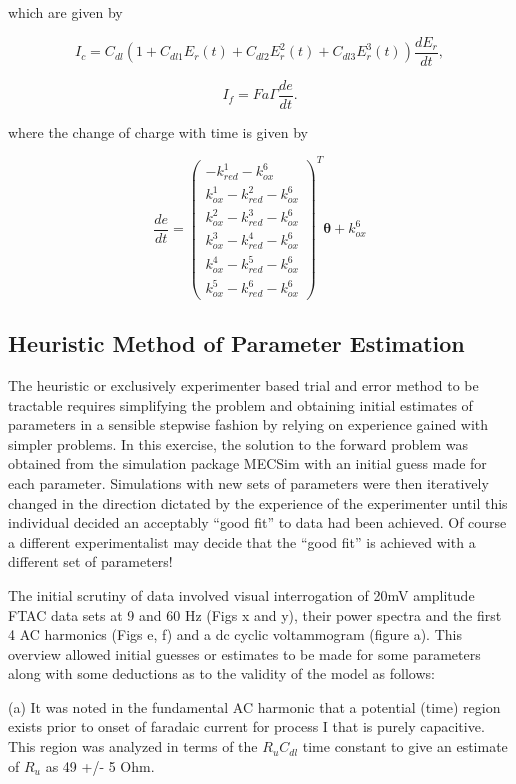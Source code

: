\documentclass[a4paper, 12pt]{article}
\begin{document}
which are given by

$$
I_c = C_{dl} \left(1 + C_{dl1} E_r(t) + C_{dl2} E_r^2(t) + C_{dl3} 
E_r^3(t)\right) \frac{dE_r}{dt},
$$

$$
I_f = F a \Gamma \frac{de}{dt}.
$$

where the change of charge with time is given by

$$
\frac{de}{dt} = 
\begin{pmatrix}
    -k^1_{red}-k^6_{ox} \\
    k^1_{ox}-k^2_{red}-k^6_{ox} \\
    k^2_{ox}-k^3_{red}-k^6_{ox} \\
    k^3_{ox}-k^4_{red}-k^6_{ox} \\
    k^4_{ox}-k^5_{red}-k^6_{ox} \\
    k^5_{ox}-k^6_{red}-k^6_{ox}
\end{pmatrix}^T \bm{\theta} +  k^6_{ox} 
$$


\subsection{Heuristic Method of Parameter Estimation} \label{sec:heuristic}

The heuristic or exclusively experimenter based trial and error method to be 
tractable requires simplifying the problem and obtaining initial estimates of 
parameters in a sensible stepwise fashion by relying on experience gained with 
simpler problems. In this exercise, the solution to the forward problem was 
obtained from the simulation package MECSim with an initial guess made for each 
parameter. Simulations with new sets of parameters were then iteratively changed 
in the direction dictated by the experience of the experimenter until this 
individual decided an acceptably “good fit” to data had been achieved. Of course 
a different experimentalist may decide that the “good fit” is achieved with a 
different set of parameters!

The initial scrutiny of data involved visual interrogation of   20mV amplitude 
FTAC data sets at 9 and 60 Hz (Figs x and y), their power spectra and the first 
4 AC harmonics (Figs e, f) and a dc cyclic voltammogram (figure a). This 
overview allowed initial guesses or estimates to be made for some parameters 
along with some deductions as to the validity of the model as follows:

(a) It was noted in the fundamental AC harmonic that a potential (time) region 
exists prior to onset of faradaic current for process I that is purely 
capacitive.  This region was analyzed in terms of the $R_u  C_{dl}$ time constant to 
give an estimate of $R_u$ as 49 +/- 5 Ohm. 
\end{document}
